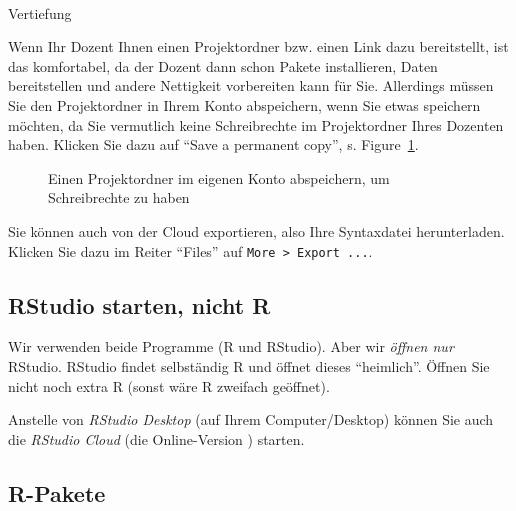 \documentclass[
  letterpaper,
  DIV=11,
  numbers=noendperiod]{scrartcl}
\makeatletter
\let\oldparagraph\paragraph
\renewcommand{\paragraph}{
    \@ifstar
      \xxxParagraphStar
      \xxxParagraphNoStar
  }
\newcommand{\xxxParagraphStar}[1]{\oldparagraph*{#1}\mbox{}}
\newcommand{\xxxParagraphNoStar}[1]{\oldparagraph{#1}\mbox{}}
\theoremstyle{definition}
\theoremstyle{definition}
\theoremstyle{definition}
\theoremstyle{remark}
\makeatother
\begin{document}
\paragraph{Vertiefung}\label{vertiefung}

Wenn Ihr Dozent Ihnen einen Projektordner bzw. einen Link dazu
bereitstellt, ist das komfortabel, da der Dozent dann schon Pakete
installieren, Daten bereitstellen und andere Nettigkeit vorbereiten kann
für Sie. Allerdings müssen Sie den Projektordner in Ihrem Konto
abspeichern, wenn Sie etwas speichern möchten, da Sie vermutlich keine
Schreibrechte im Projektordner Ihres Dozenten haben. Klicken Sie dazu
auf ``Save a permanent copy'', s. Figure~\ref{fig-perm-copy}.

\begin{figure}


\caption{\label{fig-perm-copy}Einen Projektordner im eigenen Konto
abspeichern, um Schreibrechte zu haben}

\end{figure}%

Sie können auch von der Cloud exportieren, also Ihre Syntaxdatei
herunterladen. Klicken Sie dazu im Reiter ``Files'' auf
\texttt{More\ \textgreater{}\ Export\ ...}.

\subsection{RStudio starten, nicht R}\label{rstudio-starten-nicht-r}

Wir verwenden beide Programme (R und RStudio). Aber wir \emph{öffnen
nur} RStudio. RStudio findet selbständig R und öffnet dieses
``heimlich''. Öffnen Sie nicht noch extra R (sonst wäre R zweifach
geöffnet).

Anstelle von \emph{RStudio Desktop} (auf Ihrem Computer/Desktop) können
Sie auch die \emph{RStudio Cloud} (die Online-Version ) starten.

\subsection{R-Pakete}\label{r-pakete}
\end{document}
